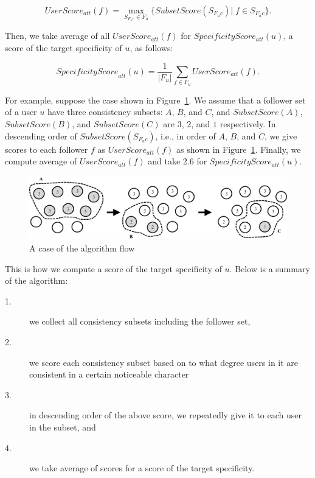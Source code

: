 \vspace{-1ex}
\[
 \mathit{UserScore}_{\mathit{att}}(f) = \max_{S_{F_uc} \in F_u}
 \{\mathit{SubsetScore}(S_{F_uc})|\;f \in S_{F_uc}\}.
\]
\vspace{-2ex}

Then, we take average of all $\mathit{UserScore_{\mathit{att}}(f)}$ for
$\mathit{SpecificityScore_{\mathit{att}}(u)}$, a score of the target
specificity of $u$, as follows:

\vspace{-1ex}
\[
 \mathit{SpecificityScore}_{\mathit{att}}(u) = \frac{1}{|F_u|}
 \sum_{f \in F_u} \mathit{UserScore}_{\mathit{att}}(f).
\]
\vspace{-2ex}

For example, suppose the case shown in Figure~\ref{fig:Algorithm}.
We assume that a follower set of a user $u$ have three consistency
subsets: $A$, $B$, and $C$, and $\mathit{SubsetScore}(A)$,
$\mathit{SubsetScore}(B)$, and $\mathit{SubsetScore}(C)$ are $3$, $2$,
and $1$ respectively.  In descending order of
$\mathit{SubsetScore}(S_{F_uc})$, i.e., in order of $A$, $B$, and $C$,
we give scores to each follower $f$ as
$\mathit{UserScore}_{\mathit{att}}(f)$ as shown in
Figure~\ref{fig:Algorithm}.  Finally, we compute average of
$\mathit{UserScore}_{\mathit{att}}(f)$ and take $2.6$ for
$\mathit{SpecificityScore_{\mathit{att}}(u)}$.

{\footnotesize
\begin{figure}[t]
\begin{center}
\includegraphics[width=14cm]{images/algorithm.eps}
 \caption{A case of the algorithm flow}
\label{fig:Algorithm}
\end{center}
\end{figure}
}

This is how we compute a score of the target specificity of $u$.  Below
is a summary of the algorithm:

\begin{description}
\item[1.]  we collect all consistency subsets including the follower set,
\item[2.]  we score each consistency subset based on to what degree users
           in it are consistent in a certain noticeable character
\item[3.]  in descending order of the above score, we repeatedly give it
           to each user in the subset, and
\item[4.]  we take average of scores for a score of the target
           specificity.
\end{description}

